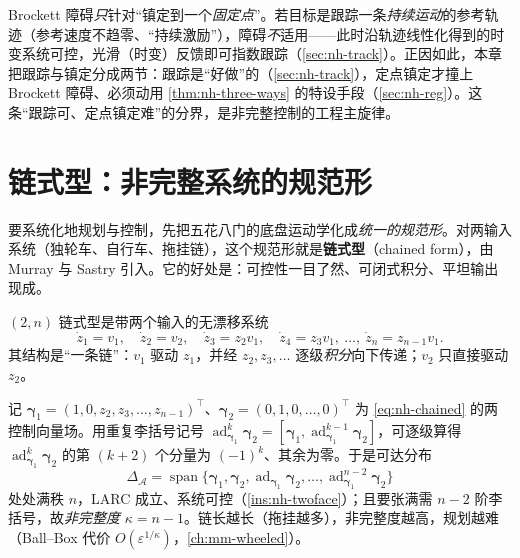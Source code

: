 \begin{pitfall}
Brockett 障碍\emph{只}针对“镇定到一个\emph{固定点}”。若目标是跟踪一条\emph{持续运动}的参考轨迹（参考速度不趋零、“持续激励”），障碍\emph{不}适用——此时沿轨迹线性化得到的时变系统可控，光滑（时变）反馈即可指数跟踪（\cref{sec:nh-track}）。正因如此，本章把跟踪与镇定分成两节：跟踪是“好做”的（\cref{sec:nh-track}），定点镇定才撞上 Brockett 障碍、必须动用 \cref{thm:nh-three-ways} 的特设手段（\cref{sec:nh-reg}）。这条“跟踪可、定点镇定难”的分界，是非完整控制的工程主旋律。
\end{pitfall}

\section{链式型：非完整系统的规范形}
\label{sec:nh-chained}

要系统化地规划与控制，先把五花八门的底盘运动学化成\emph{统一的规范形}。对两输入系统（独轮车、自行车、拖挂链），这个规范形就是\textbf{链式型}（chained form），由 Murray 与 Sastry 引入\cite{murray1993sinusoids}。它的好处是：可控性一目了然、可闭式积分、平坦输出现成。

\begin{definition}[$(2,n)$ 链式型]\label{def:nh-chained}
$(2,n)$ 链式型是带两个输入的无漂移系统
\begin{equation}
  \dot z_1=v_1,\quad \dot z_2=v_2,\quad \dot z_3=z_2 v_1,\quad \dot z_4=z_3 v_1,\ \dots,\ \dot z_n=z_{n-1}v_1 .
  \label{eq:nh-chained}
\end{equation}
其结构是“一条链”：$v_1$ 驱动 $z_1$，并经 $z_2,z_3,\dots$ 逐级\emph{积分}向下传递；$v_2$ 只直接驱动 $z_2$。
\end{definition}

\begin{proposition}[链式型必可控，且非完整度 $\kappa=n-1$]\label{prop:nh-chained-ctrl}
记 $\boldsymbol{\gamma}_1=(1,0,z_2,z_3,\dots,z_{n-1})^\top$、$\boldsymbol{\gamma}_2=(0,1,0,\dots,0)^\top$ 为 \cref{eq:nh-chained} 的两控制向量场。用重复李括号记号 $\operatorname{ad}_{\boldsymbol{\gamma}_1}^k\boldsymbol{\gamma}_2=[\boldsymbol{\gamma}_1,\operatorname{ad}_{\boldsymbol{\gamma}_1}^{k-1}\boldsymbol{\gamma}_2]$，可逐级算得 $\operatorname{ad}_{\boldsymbol{\gamma}_1}^k\boldsymbol{\gamma}_2$ 的第 $(k+2)$ 个分量为 $(-1)^k$、其余为零。于是可达分布
\begin{equation}
  \Delta_{\mathcal{A}}=\operatorname{span}\{\boldsymbol{\gamma}_1,\boldsymbol{\gamma}_2,\operatorname{ad}_{\boldsymbol{\gamma}_1}\boldsymbol{\gamma}_2,\dots,\operatorname{ad}_{\boldsymbol{\gamma}_1}^{n-2}\boldsymbol{\gamma}_2\}
  \label{eq:nh-chained-acc}
\end{equation}
处处满秩 $n$，LARC 成立、系统可控（\cref{ins:nh-twoface}）；且要张满需 $n-2$ 阶李括号，故\emph{非完整度} $\kappa=n-1$。链长越长（拖挂越多），非完整度越高，规划越难（Ball--Box 代价 $O(\varepsilon^{1/\kappa})$，\cref{ch:mm-wheeled}）。
\end{proposition}


